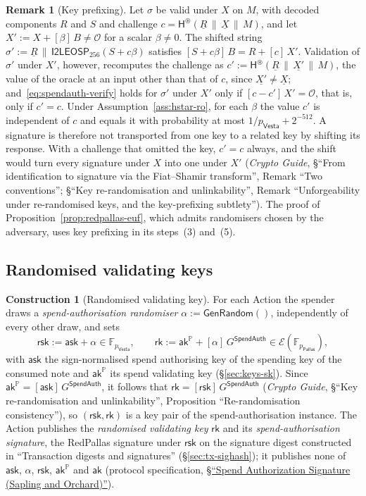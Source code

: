 \documentclass[11pt,a4paper]{article}
\theoremstyle{definition}
\newtheorem{construction}[theorem]{Construction}
\newtheorem{remark}[theorem]{Remark}
\newcommand{\F}{\mathbb{F}}
\newcommand{\PP}{\mathbb{P}}
\newcommand{\rk}{\mathsf{rk}}
\newcommand{\Pallas}{\ensuremath{\mathsf{Pallas}}}
\newcommand{\Vesta}{\ensuremath{\mathsf{Vesta}}}
\newcommand{\Ep}{\ensuremath{\mathcal{E}}}
\newcommand{\ask}{\ensuremath{\mathsf{ask}}}
\newcommand{\aksym}{\ensuremath{\mathsf{ak}}}
\newcommand{\rsk}{\ensuremath{\mathsf{rsk}}}
\begin{document}
\begin{remark}[Key prefixing]
Let $\sigma$ be valid under $X$ on $M$, with decoded components $R$ and $S$
and challenge
$c = \mathsf{H}^{\circledast}(\underline{R} \,\|\, \underline{X} \,\|\, M)$,
and let $X' := X + [\beta]\,B \neq \mathcal{O}$ for a scalar $\beta \neq 0$.
The shifted string
$\sigma' := \underline{R} \,\|\, \mathsf{I2LEOSP}_{256}(S + c\beta)$
satisfies $[S + c\beta]\,B = R + [c]\,X'$. Validation of $\sigma'$ under
$X'$, however, recomputes the challenge as
$c' := \mathsf{H}^{\circledast}(\underline{R} \,\|\, \underline{X'} \,\|\,
M)$, the value of the oracle at an input other than that of $c$, since
$\underline{X'} \neq \underline{X}$; and~\eqref{eq:spendauth-verify} holds
for $\sigma'$ under $X'$ only if $[c - c']\,X' = \mathcal{O}$, that is, only
if $c' = c$. Under Assumption~\ref{ass:hstar-ro}, for each $\beta$ the value
$c'$ is independent of $c$ and equals it with probability at most
$1/p_{\Vesta} + 2^{-512}$. A signature is therefore not transported from one
key to a related key by shifting its response. With a challenge that omitted
the key, $c' = c$ always, and the shift would turn every signature under $X$
into one under $X'$ (\emph{Crypto Guide}, \S``From identification to
signature via the Fiat--Shamir transform'', Remark ``Two conventions'';
\S``Key re-randomisation and unlinkability'', Remark ``Unforgeability under
re-randomised keys, and the key-prefixing subtlety''). The proof of
Proposition~\ref{prop:redpallas-euf}, which admits randomisers chosen by the
adversary, uses key prefixing in its steps~(3) and~(5).
\end{remark}

\FloatBarrier
\subsection{Randomised validating keys}\label{sec:spendauth-rk}

\begin{construction}[Randomised validating key]
For each Action the spender draws a \emph{spend-authorisation randomiser}
$\alpha := \mathsf{GenRandom}()$, independently of every other draw, and sets
\[
  \rsk := \ask + \alpha \in \F_{p_{\Vesta}}, \qquad
  \rk := \aksym^{\PP} + [\alpha]\,G^{\mathsf{SpendAuth}}
    \in \Ep(\F_{p_{\Pallas}}),
\]
with $\ask$ the sign-normalised spend authorising key of the spending key of
the consumed note and $\aksym^{\PP}$ its spend validating key
(\S\ref{sec:keys-sk}). Since $\aksym^{\PP} = [\ask]\,G^{\mathsf{SpendAuth}}$,
it follows that $\rk = [\rsk]\,G^{\mathsf{SpendAuth}}$ (\emph{Crypto Guide},
\S``Key re-randomisation and unlinkability'', Proposition
``Re-randomisation consistency''), so $(\rsk, \rk)$ is a key pair of the
spend-authorisation instance. The Action publishes the \emph{randomised
validating key} $\rk$ and its \emph{spend-authorisation signature}, the
RedPallas signature under $\rsk$ on the signature digest constructed in
``Transaction digests and signatures'' (\S\ref{sec:tx-sighash}); it
publishes none of $\ask$, $\alpha$, $\rsk$, $\aksym^{\PP}$ and $\aksym$
(protocol specification,
\href{https://zips.z.cash/protocol/protocol.pdf#spendauthsig}%
{\S``Spend Authorization Signature (Sapling and Orchard)''}).
\end{construction}
\end{document}
